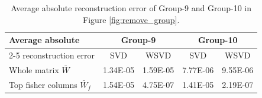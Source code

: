 \begin{table}
\centering
\caption{Average absolute reconstruction error of Group-9 and Group-10 in Figure \ref{fig:remove_group}.}
\begin{tabular}{l|cc|cc}
\toprule
{Average absolute }& \multicolumn{2}{c|}{Group-9} & \multicolumn{2}{c}{Group-10} \\ \cline{2-5}
 reconstruction error & SVD & WSVD & SVD & WSVD \\ \midrule
Whole matrix $\bar W$ & 1.34E-05 & 1.59E-05 & 7.77E-06 & 9.55E-06 \\
Top fisher columns $\bar W_f$ & 1.54E-05 & 4.75E-07 & 1.41E-05 & 2.19E-07 \\
\bottomrule
\end{tabular}
\end{table}